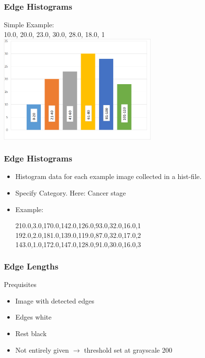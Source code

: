 \documentclass{beamer}
\begin{document}
\begin{frame}
	\frametitle{Edge Histograms}
	Simple Example:\\
	10.0, 20.0, 23.0, 30.0, 28.0, 18.0, 1\\
	\includegraphics[width = 8cm]{histogram.png}	
	
\end{frame}

\begin{frame}[fragile]
	\frametitle{Edge Histograms}
	\begin{itemize}
		\item Histogram data for each example image collected in a hist-file.
		\item Specify Category. Here: Cancer stage
		\item Example:\\
		\begin{verbatimtab}[1]
210.0,3.0,170.0,142.0,126.0,93.0,32.0,16.0,1
192.0,2.0,181.0,139.0,119.0,87.0,32.0,17.0,2
143.0,1.0,172.0,147.0,128.0,91.0,30.0,16.0,3
		\end{verbatimtab}
		
	\end{itemize}
	
\end{frame}

\begin{frame}
	\frametitle{Edge Lengths}
	\begin{block}{Prequisites}
		\begin{itemize}
			\item Image with detected edges
			\item Edges white
			\item Rest black
			\item Not entirely given $\rightarrow$ threshold set at grayscale 200
		\end{itemize}
	\end{block}
	
\end{frame}
\end{document}
